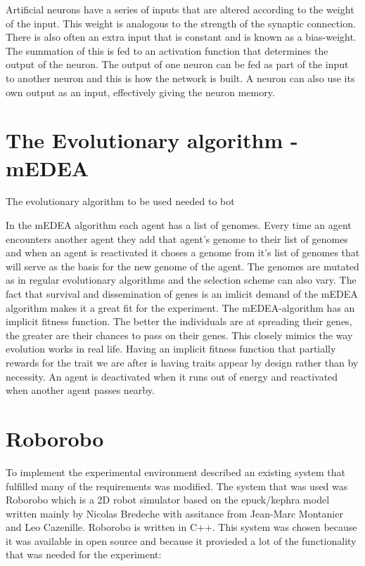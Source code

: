 \documentclass[a4paper]{book}
\begin{document}
Artificial neurons have a series of inputs that are altered according to the weight of the input. This weight is analogous to the strength of the synaptic connection.
There is also often an extra input that is constant and is known as a bias-weight. The summation of this is fed to an activation function that determines the output of the neuron. The output of one neuron can be fed as part of the input to another neuron and this is how the network is built. A neuron can also use its own output as an input, effectively giving the neuron memory. 



\section{The Evolutionary algorithm - mEDEA}

The evolutionary algorithm to be used needed to bot

In the mEDEA algorithm each agent has a list of genomes. Every time an agent encounters another agent they add that agent's genome to their list of genomes and when an agent is reactivated it choses a genome from it's list of genomes that will serve as the basis for the new genome of the agent. The genomes are mutated as in regular evolutionary algorithms and the selection scheme can also vary. The fact that survival and dissemination of genes is an imlicit demand of the mEDEA algorithm makes it a great fit for the experiment. The mEDEA-algorithm has an implicit fitness function. The better the individuals are at spreading their genes, the greater are their chances to pass on their genes. This closely mimics the way evolution works in real life.  Having an implicit fitness function that partially rewards for the trait we are after is having traits appear by design rather than by necessity. An agent is deactivated when it runs out of energy and reactivated when another agent passes nearby.

\section{Roborobo}

To implement the experimental environment described an existing system that fulfilled many of the requirements was modified.
The system that was used was Roborobo which is a 2D robot simulator based on the epuck/kephra model written mainly by Nicolas Bredeche with assitance from Jean-Marc Montanier and Leo Cazenille. Roborobo is written in C++.
This system was chosen because it was available in open source and because it provieded a lot of the functionality that was needed for the experiment:
\end{document}
